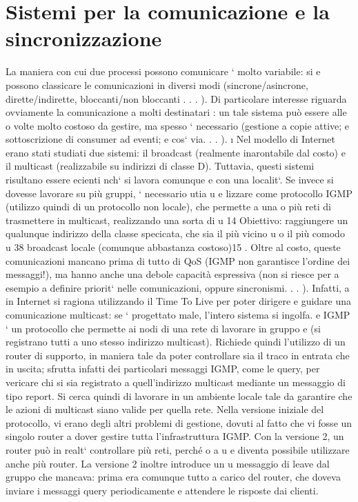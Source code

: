 \documentclass[a4paper,12pt]{article}
\begin{document}
\section{Sistemi per la comunicazione e la sincronizzazione}
La maniera con cui due processi possono comunicare ` molto variabile: si
e
possono classicare le comunicazioni in diversi modi (sincrone/asincrone, dirette/indirette, bloccanti/non bloccanti . .
. ). Di particolare interesse riguarda
ovviamente la comunicazione a molti destinatari : un tale sistema può essere alle
o
volte molto costoso da gestire, ma spesso ` necessario (gestione a copie attive;
e
sottoscrizione di consumer ad eventi; e cos` via. . . ).
\i{}
Nel modello di Internet erano stati studiati due sistemi: il broadcast (realmente inarontabile dal costo) e il multicast
(realizzabile su indirizzi di classe
D). Tuttavia, questi sistemi risultano essere ecienti nch` si lavora comunque
e
con una localit`. Se invece si dovesse lavorare su più gruppi, ` necessario utia
u
e
lizzare come protocollo IGMP (utilizzo quindi di un protocollo non locale), che
permette a una o più reti di trasmettere in multicast, realizzando una sorta di
u
14 Obiettivo: raggiungere un qualunque indirizzo della classe specicata, che sia il più vicino
u
o il più comodo
u
38
broadcast locale (comunque abbastanza costoso)15 . Oltre al costo, queste comunicazioni mancano prima di tutto di QoS
(IGMP non garantisce l'ordine dei
messaggi!), ma hanno anche una debole capacità espressiva (non si riesce per
a
esempio a definire priorit` nelle comunicazioni, oppure sincronismi. . . ). Infatti,
a
in Internet si ragiona utilizzando il Time To Live per poter dirigere e guidare
una comunicazione multicast: se ` progettato male, l'intero sistema si ingolfa.
e
IGMP ` un protocollo che permette ai nodi di una rete di lavorare in gruppo
e
(si registrano tutti a uno stesso indirizzo multicast). Richiede quindi l'utilizzo
di un router di supporto, in maniera tale da poter controllare sia il traco in
entrata che in uscita; sfrutta infatti dei particolari messaggi IGMP, come le
query, per vericare chi si sia registrato a quell'indirizzo multicast mediante un
messaggio di tipo report. Si cerca quindi di lavorare in un ambiente locale tale
da garantire che le azioni di multicast siano valide per quella rete.
Nella versione iniziale del protocollo, vi erano degli altri problemi di gestione,
dovuti al fatto che vi fosse un singolo router a dover gestire tutta l'infrastruttura
IGMP. Con la versione 2, un router può in realt` controllare più reti, perché
o
a
u
e
diventa possibile utilizzare anche più router. La versione 2 inoltre introduce un
u
messaggio di leave dal gruppo che mancava: prima era comunque tutto a carico
del router, che doveva inviare i messaggi query periodicamente e attendere le
risposte dai clienti.
\end{document}
